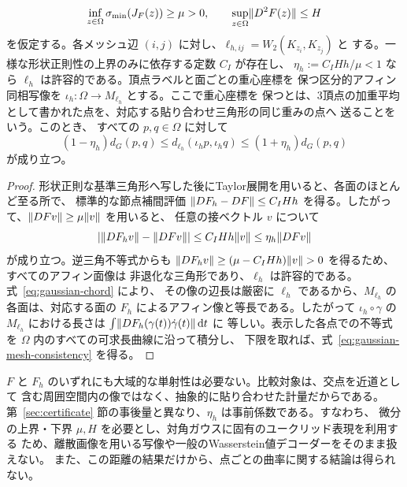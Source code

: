 \begin{proposition}[ガウスメッシュの整合性]
\label{prop:gaussian-mesh-consistency}
\begin{equation}
 \inf_{z\in\Omega}\sigma_{\min}(J_F(z))\ge\mu>0,
 \qquad
 \sup_{z\in\Omega}\lVert D^2F(z)\rVert\le H
 \label{eq:gaussian-consistency-assumptions}
\end{equation}
を仮定する。各メッシュ辺 $(i,j)$ に対し、$\ell_{h,ij}=W_2(K_{z_i},K_{z_j})$ と
する。一様な形状正則性の上界のみに依存する定数 $C_I$ が存在し、
$\eta_h:=C_IHh/\mu<1$ なら $\ell_h$ は許容的である。頂点ラベルと面ごとの重心座標を
保つ区分的アフィン同相写像を $\iota_h:\Omega\to M_{\ell_h}$ とする。ここで重心座標を
保つとは、3頂点の加重平均として書かれた点を、対応する貼り合わせ三角形の同じ重みの点へ
送ることをいう。このとき、
すべての $p,q\in\Omega$ に対して
\begin{equation}
 (1-\eta_h)d_G(p,q)
 \le d_{\ell_h}(\iota_hp,\iota_hq)
 \le(1+\eta_h)d_G(p,q)
 \label{eq:gaussian-mesh-consistency}
\end{equation}
が成り立つ。
\end{proposition}

\begin{proof}
形状正則な基準三角形へ写した後にTaylor展開を用いると、各面のほとんど至る所で、
標準的な節点補間評価\cite{ciarlet1978}
$\lVert D F_h-D F\rVert\le C_IHh$ を得る。したがって、$\lVert DFv\rVert\ge\mu\lVert v\rVert$ を用いると、
任意の接ベクトル $v$ について
\begin{equation}
 \lvert \lVert D F_hv\rVert-\lVert D Fv\rVert\rvert
 \le C_IHh\lVert v\rVert
 \le\eta_h\lVert D Fv\rVert
\end{equation}
が成り立つ。逆三角不等式からも
$\lVert D F_hv\rVert\ge(\mu-C_IHh)\lVert v\rVert>0$ を得るため、すべてのアフィン面像は
非退化な三角形であり、$\ell_h$ は許容的である。式~\eqref{eq:gaussian-chord} により、
その像の辺長は厳密に $\ell_h$ であるから、$M_{\ell_h}$ の各面は、対応する面の
$F_h$ によるアフィン像と等長である。したがって $\iota_h\circ\gamma$ の
$M_{\ell_h}$ における長さは $\int\lVert D F_h(\gamma(t))\dot\gamma(t)\rVert\,\mathrm{d} t$ に
等しい。表示した各点での不等式を $\Omega$ 内のすべての可求長曲線に沿って積分し、
下限を取れば、式~\eqref{eq:gaussian-mesh-consistency} を得る。
\end{proof}

$F$ と $F_h$ のいずれにも大域的な単射性は必要ない。比較対象は、交点を近道として
含む周囲空間内の像ではなく、抽象的に貼り合わせた計量だからである。
第~\ref{sec:certificate} 節の事後量と異なり、$\eta_h$ は事前係数である。すなわち、
微分の上界・下界 $\mu,H$ を必要とし、対角ガウスに固有のユークリッド表現を利用する
ため、離散画像を用いる写像や一般のWasserstein値デコーダーをそのまま扱えない。
また、この距離の結果だけから、点ごとの曲率に関する結論は得られない。

